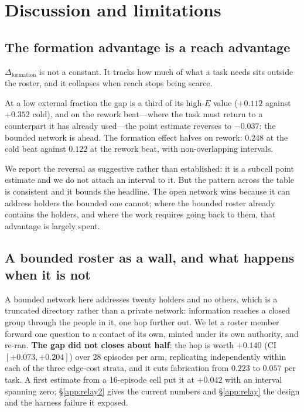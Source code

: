 \section{Discussion and limitations}

\subsection{The formation advantage is a reach advantage}

$\Delta_\text{formation}$ is not a constant. It tracks how much of what a task needs
sits outside the roster, and it collapses when reach stops being scarce.

At a low external fraction the gap is a third of its high-$E$ value ($+0.112$ against
$+0.352$ cold), and on the rework beat---where the task must return to a counterpart it
has already used---the point estimate reverses to $-0.037$: the bounded network is ahead.
The formation effect halves on rework: $0.248$ at the cold beat against $0.122$ at the
rework beat, with non-overlapping intervals.

We report the reversal as suggestive rather than established: it is a subcell point
estimate and we do not attach an interval to it. But the pattern across the table is
consistent and it bounds the headline. The open network wins because it can address
holders the bounded one cannot; where the bounded roster already contains the holders,
and where the work requires going back to them, that advantage is largely spent.

\subsection{A bounded roster as a wall, and what happens when it is not}

A bounded network here addresses twenty holders and no others, which is a truncated
directory rather than a private network: information reaches a closed group through the
people in it, one hop further out. We let a roster member forward one question to a
contact of its own, minted under its own authority, and re-ran. \textbf{The gap did not
closes about half}: the hop is worth $+0.140$ (CI $[+0.073, +0.204]$) over 28 episodes
per arm, replicating independently within each of the three edge-cost strata, and it cuts
fabrication from $0.223$ to $0.057$ per task. A first estimate from a 16-episode cell put
it at $+0.042$ with an interval spanning zero; \S\ref{app:relay2} gives the current
numbers and \S\ref{app:relay} the design and the harness failure it exposed.

